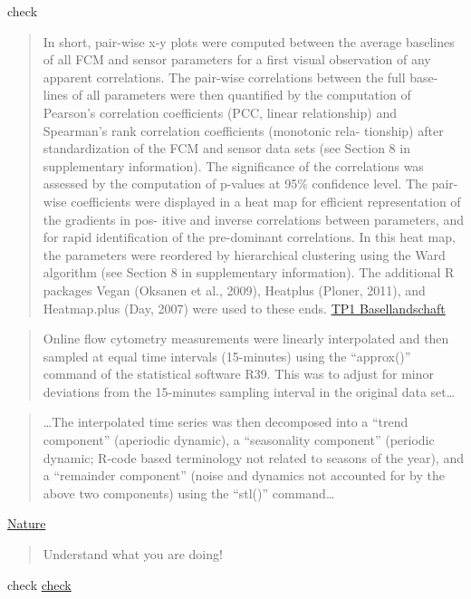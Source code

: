 \documentclass[8pt,ignorenonframetext,]{beamer}
\begin{document}
\begin{frame}{check}

\begin{quote}
In short, pair-wise x-y plots were computed between the average
baselines of all FCM and sensor parameters for a first visual
observation of any apparent correlations. The pair-wise correlations
between the full base- lines of all parameters were then quantified by
the computation of Pearson's correlation coefficients (PCC, linear
relationship) and Spearman's rank correlation coefficients (monotonic
rela- tionship) after standardization of the FCM and sensor data sets
(see Section 8 in supplementary information). The significance of the
correlations was assessed by the computation of p-values at 95\%
confidence level. The pair-wise coefficients were displayed in a heat
map for efficient representation of the gradients in pos- itive and
inverse correlations between parameters, and for rapid identification of
the pre-dominant correlations. In this heat map, the parameters were
reordered by hierarchical clustering using the Ward algorithm (see
Section 8 in supplementary information). The additional R packages Vegan
(Oksanen et al., 2009), Heatplus (Ploner, 2011), and Heatmap.plus (Day,
2007) were used to these ends.
\href{https://www.baselland.ch/politik-und-behorden/direktionen/bau-und-umweltschutzdirektion/umweltschutz-energie/wasser/wasserversorgung/publikationen/downloads/tp1-karstsysteme.pdf}{TP1
Basellandschaft}
\end{quote}

\begin{quote}
Online flow cytometry measurements were linearly interpolated and then
sampled at equal time intervals (15-minutes) using the ``approx()''
command of the statistical software R39. This was to adjust for minor
deviations from the 15-minutes sampling interval in the original data
set\ldots{}
\end{quote}

\begin{quote}
\ldots{}The interpolated time series was then decomposed into a ``trend
component'' (aperiodic dynamic), a ``seasonality component'' (periodic
dynamic; R-code based terminology not related to seasons of the year),
and a ``remainder component'' (noise and dynamics not accounted for by
the above two components) using the ``stl()'' command\ldots{}
\end{quote}

\href{https://www.nature.com/articles/srep38462}{Nature}

\begin{quote}
Understand what you are doing!
\end{quote}

check
\href{http://uribo.github.io/rpkg_showcase/date_and_time/zoo.html}{check}

\end{frame}
\end{document}
